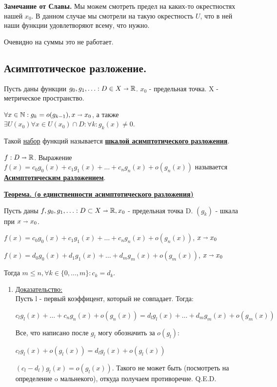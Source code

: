 \documentclass{article}
\newcommand{\deff}[1]{\underline{\textbf{#1}}}
\newcommand{\thmm}[1]{\underline{\textbf{#1}}}
\newcommand{\prooff}[1]{{\underline{Доказательство:}} \\ }
\begin{document}
\textbf{Замечание от Славы.} Мы  можем смотреть предел на каких-то окрестностях нашей $x_0$. В данном случае мы смотрели на такую окрестность $U$, что в ней наши функции удовлетворяют всему, что нужно.

Очевидно на суммы это не работает. 

\subsection{Асимптотическое разложение.}

Пусть даны функции $g_0,g_1,\ldots : D \in X \shortrightarrow \mathbb{R}$. $x_0$ - предельная точка. X - метрическое пространство.

$\forall x \in \mathbb{N}: g_k = o(g_{k-1}), x\shortrightarrow x_0$, а также $\exists U(x_0) \forall x \in U(x_0)\cap D: \forall k: g_k(x) \neq 0$.

Такой \uline{набор} функций называется \deff{шкалой асимптотического разложения}.

$f: D \shortrightarrow \mathbb{R}$. Выражение $f(x) = c_0 g_0(x) + c_1 g_1(x) + \ldots + c_n g_n(x) + o(g_n(x)) $ называется \deff{Асимптотическим разложением}.

\thmm{Теорема. (о единственности асимптотического разложения)}

Пусть даны $f,g_0,g_1, \ldots: D \subset X \shortrightarrow \mathbb{R}, x_0$ - предельная точка D. $(g_k)$ - шкала при $x\shortrightarrow x_0$.

$f(x) =  c_0 g_0(x) + c_1 g_1(x) + \ldots + c_n g_n(x) + o(g_n(x))$, $x\shortrightarrow x_0$

$f(x) =  d_0 g_0(x) + d_1 g_1(x) + \ldots + d_m g_m(x) + o(g_m(x))$, $x\shortrightarrow x_0$

Тогда $m\leq n, \forall k \in \{0,\ldots,m\}: c_k = d_k$.

\begin{enumerate}
    \item[] \prooff{}
    Пусть l - первый коэффицент, который не совпадает. Тогда:

     $ c_l g_l(x) + \ldots + c_n g_n(x) + o(g_n(x)) =  d_l g_l(x) + \ldots + d_m g_m(x) + o(g_m(x))$
     
     Все, что написано после $g_l$ могу обозначить за $o(g_l)$:

      $ c_l g_l(x) + o(g_l(x)) = d_l g_l(x) + o(g_l(x))$

      $(c_l-d_l) g_l(x) = o(g_l(x))$. Такого не может быть (посмотреть на определение o мальнекого), откуда получаем противоречие.  Q.E.D.
\end{enumerate}
\end{document}

